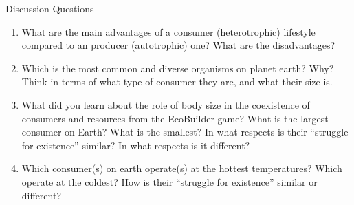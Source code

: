 \begin{frame}{Discussion Questions}

  \begin{enumerate}\setlength{\itemindent}{-2em}\itemsep2pt
  
    \item What are the main advantages of a consumer (heterotrophic) lifestyle  compared to an producer (autotrophic) one? What are the disadvantages? 

    \item Which is the most common and diverse organisms on planet earth\footnotemark? Why? Think in terms of what type of consumer they are, and what their size is.
        
    \item What did you learn about the role of body size in the coexistence of consumers and resources from the EcoBuilder game? What is the largest consumer on Earth? What is the smallest? In what respects is their ``struggle for existence'' similar? In what respects is it different?

    \item Which consumer(s) on earth operate(s) at the hottest temperatures? Which operate at the coldest? How is their ``struggle for existence'' similar or different?

  \end{enumerate}


\end{frame}

